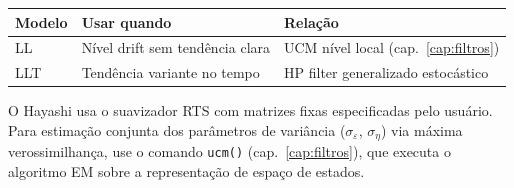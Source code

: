 \begin{center}
\begin{tabular}{lll}
\toprule
\textbf{Modelo} & \textbf{Usar quando} & \textbf{Relação} \\
\midrule
LL  & Nível drift sem tendência clara   & UCM nível local (cap.~\ref{cap:filtros}) \\
LLT & Tendência variante no tempo       & HP filter generalizado estocástico \\
\bottomrule
\end{tabular}
\end{center}

\begin{nota}
  O Hayashi usa o suavizador RTS com matrizes fixas especificadas pelo
  usuário. Para estimação conjunta dos parâmetros de variância
  ($\sigma_\varepsilon$, $\sigma_\eta$) via máxima verossimilhança,
  use o comando \texttt{ucm()} (cap.~\ref{cap:filtros}), que executa
  o algoritmo EM sobre a representação de espaço de estados.
\end{nota}
